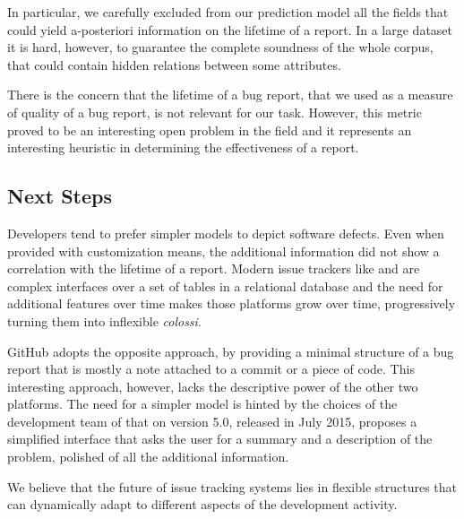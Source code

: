 In particular, we carefully excluded from our prediction model all the fields that could yield a-posteriori information on the lifetime of a report.
In a large dataset it is hard, however, to guarantee the complete soundness of the whole corpus, that could contain hidden relations between some attributes.

There is the concern that the lifetime of a bug report, that we used as a measure of quality of a bug report, is not relevant for our task.
However, this metric proved to be an interesting open problem in the field and it represents an interesting heuristic in determining the effectiveness of a report.


\subsection{Next Steps}

Developers tend to prefer simpler models to depict software defects.
Even when provided with customization means, the additional information did not show a correlation with the lifetime of a report.
Modern issue trackers like \jira and \bzilla are complex interfaces over a set of tables in a relational database and the need for additional features over time makes those platforms grow over time, progressively turning them into inflexible \emph{colossi}.

GitHub adopts the opposite approach, by providing a minimal structure of a bug report that is mostly a note attached to a commit or a piece of code.
This interesting approach, however, lacks the descriptive power of the other two platforms.
The need for a simpler model is hinted by the choices of the development team of \bzilla that on version 5.0, released in July 2015, proposes a simplified interface that asks the user for a summary and a description of the problem, polished of all the additional information.

We believe that the future of issue tracking systems lies in flexible structures that can dynamically adapt to different aspects of the development activity.


